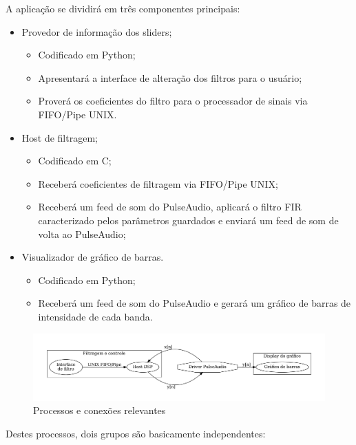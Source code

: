 A aplicação se dividirá em três componentes principais:
\begin{multicols}{2}   
    \begin{itemize}
        \item Provedor de informação dos sliders;
        \begin{itemize}
            \item Codificado em Python;
            \item Apresentará a interface de alteração dos filtros para o usuário;
            \item Proverá os coeficientes do filtro para o processador de sinais via FIFO/Pipe UNIX.
        \end{itemize}
        \item Host de filtragem;
        \begin{itemize}
            \item Codificado em C;
            \item Receberá coeficientes de filtragem via FIFO/Pipe UNIX;
            \item Receberá um feed de som do PulseAudio, aplicará o filtro FIR caracterizado pelos parâmetros guardados e enviará um feed de som de volta ao PulseAudio;
        \end{itemize}
        \columnbreak
        \item Visualizador de gráfico de barras.
        \begin{itemize}
            \item Codificado em Python;
            \item Receberá um feed de som do PulseAudio e gerará um gráfico de barras de intensidade de cada banda.
        \end{itemize}
    \end{itemize}
\end{multicols}
\begin{figure}[H]
    \centering
    \includegraphics[scale=0.45]{fig/app.pdf}
    \caption{Processos e conexões relevantes}
    \label{fig:app}
\end{figure}


Destes processos, dois grupos são basicamente independentes:

